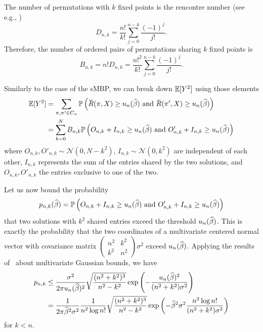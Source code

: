 The number of permutations with $k$ fixed points is the rencontre number
(see e.g., \cite{spa-book})
\begin{equation}
D_{n,k} = \frac{n!}{k!}\sum_{j=0}^{n-k}\frac{(-1)^j}{j!}.
\end{equation}
Therefore, the number of ordered pairs of permutations sharing $k$ fixed points is
\begin{equation}\label{eq:lawler-bnk}
B_{n,k} = n!D_{n,k}=\frac{n!^2}{k!}\sum_{j=0}^{n-k}\frac{(-1)^j}{j!}.
\end{equation}

Similarly to the case of the sMBP, we can break down ${\mathbb{E}}[Y^2]$ using those elements
\begin{align}
{\mathbb{E}}[Y^2] &= \sum_{\pi,\pi'\in C_n} {\mathbb{P}}\left(\mspace{2mu}\overline{\mspace{-2mu}R\mspace{-2mu}}\mspace{2mu}(\pi, X)\geq u_n(\widehat{\beta})\text{ and }\mspace{2mu}\overline{\mspace{-2mu}R\mspace{-2mu}}\mspace{2mu}(\pi',X)\geq u_n(\widehat{\beta})\right)\\
&= \sum_{k=0}^N B_{n,k} {\mathbb{P}}\left(O_{n,k}+I_{n,k}\geq u_n(\widehat{\beta})
\text{ and }O'_{n,k}+I_{n,k}\geq u_n(\widehat{\beta})\right)\label{eq:lawler-ey2}
\end{align}
where $O_{n,k},O'_{n,k}\sim\mathcal{N}(0,N-k^2)$,
$I_{n,k}\sim\mathcal{N}(0,k^2)$ are independent of each other, $I_{n,k}$
represents the sum of the entries shared by the two solutions, and
$O_{n,k},O'_{n,k}$ the entries exclusive to one of the two. 

Let us now bound the probability
\begin{equation}
 p_{n,k}(\widehat{\beta})={\mathbb{P}}\left(O_{n,k}+I_{n,k}\geq u_n(\widehat{\beta})\text{ and } O'_{n,k}+I_{n,k}\geq u_n(\widehat{\beta})\right)
\end{equation}
that two solutions with $k^2$ shared entries exceed the threshold $u_n(\widehat{\beta})$.
This is exactly the probability that the two coordinates of a multivariate
centered normal vector with covariance matrix 
$\left(\begin{smallmatrix} n^2&k^2\\ k^2&n^2 \end{smallmatrix}\right)\sigma^2$ exceed $u_n(\widehat{\beta})$.
Applying the results of~\citep{savage1962mills} about multivariate Gaussian bounds, 
we have
\begin{align}
p_{n,k} &\leq \frac{\sigma^2}{2\pi
u_n(\widehat{\beta})^2}\sqrt{\frac{(n^2+k^2)^3}{n^2-k^2}}\exp\left(-\frac{u_n(\widehat{\beta})^2}{(n^2+k^2)\sigma^2}\right)\\
&= \frac{1}{2\pi \widehat{\beta}^2\sigma^2}\frac{1}{n^2\log
n!}\sqrt{\frac{(n^2+k^2)^3}{n^2-k^2}}\exp\left(-\widehat{\beta}^2\sigma^2\frac{n^2\log
n!}{(n^2+k^2)\sigma^2}\right) \label{eq:lawler-pnk}
\end{align}
for $k<n$.

